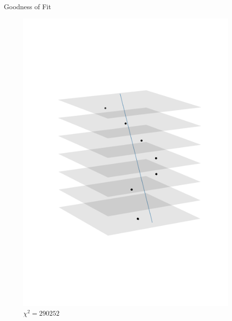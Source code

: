 \documentclass{beamer}
\begin{document}
\begin{frame}{Goodness of Fit}
\begin{minipage}{.32\textwidth}
\begin{figure}[H]
	\includegraphics[trim=0 80 0 80,clip,width=\textwidth]{example_290252.png}
	\caption*{\( \chi ^2 = 290252 \)}
    \end{figure}
    \end{minipage}
\end{frame}
\end{document}
